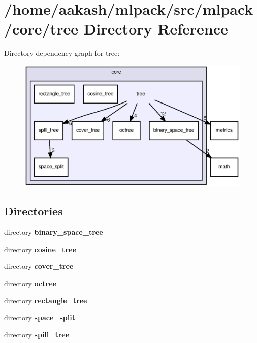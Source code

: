 \section{/home/aakash/mlpack/src/mlpack/core/tree Directory Reference}
\label{dir_d361cbf9654077cd65f7968e3f8eccf6}
Directory dependency graph for tree\+:
\nopagebreak
\begin{figure}[H]
\begin{center}
\leavevmode
\includegraphics[width=350pt]{dir_d361cbf9654077cd65f7968e3f8eccf6_dep}
\end{center}
\end{figure}
\subsection*{Directories}
\begin{DoxyCompactItemize}
\item 
directory \textbf{ binary\+\_\+space\+\_\+tree}
\item 
directory \textbf{ cosine\+\_\+tree}
\item 
directory \textbf{ cover\+\_\+tree}
\item 
directory \textbf{ octree}
\item 
directory \textbf{ rectangle\+\_\+tree}
\item 
directory \textbf{ space\+\_\+split}
\item 
directory \textbf{ spill\+\_\+tree}
\end{DoxyCompactItemize}
